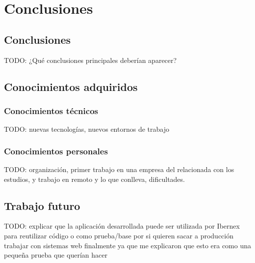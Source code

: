 \chapter{Conclusiones}

\section{Conclusiones}

TODO: ¿Qué conclusiones principales deberían aparecer?

\section{Conocimientos adquiridos}

\subsection{Conocimientos técnicos}

TODO: nuevas tecnologías, nuevos entornos de trabajo

\subsection{Conocimientos personales}

TODO:  organización, primer trabajo en una empresa del relacionada con los estudios, y trabajo en remoto y lo que conlleva, dificultades.

\section{Trabajo futuro}

TODO: explicar que la aplicación desarrollada puede ser utilizada por Ibernex para reutilizar código o como prueba/base por si quieren sacar a producción trabajar con sistemas web finalmente ya que me explicaron que esto era como una pequeña prueba que querían hacer